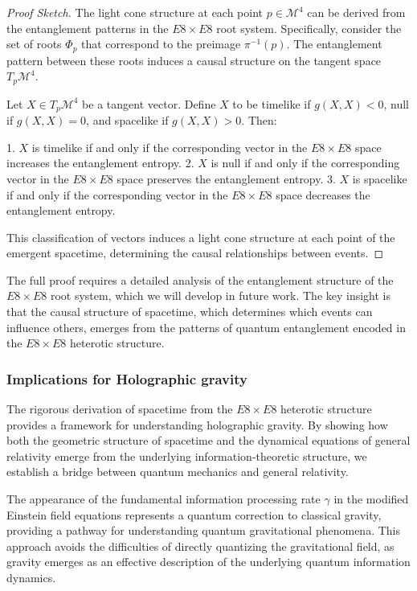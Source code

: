 \documentclass[11pt,english,twoside]{article}
\begin{document}
\begin{proof}[Proof Sketch]
The light cone structure at each point $p \in \mathcal{M}^4$ can be derived from the entanglement patterns in the $E8\times E8$ root system. Specifically, consider the set of roots $\Phi_p$ that correspond to the preimage $\pi^{-1}(p)$. The entanglement pattern between these roots induces a causal structure on the tangent space $T_p\mathcal{M}^4$.

Let $X \in T_p\mathcal{M}^4$ be a tangent vector. Define $X$ to be timelike if $g(X,X) < 0$, null if $g(X,X) = 0$, and spacelike if $g(X,X) > 0$. Then:

1. $X$ is timelike if and only if the corresponding vector in the $E8\times E8$ space increases the entanglement entropy.
2. $X$ is null if and only if the corresponding vector in the $E8\times E8$ space preserves the entanglement entropy.
3. $X$ is spacelike if and only if the corresponding vector in the $E8\times E8$ space decreases the entanglement entropy.

This classification of vectors induces a light cone structure at each point of the emergent spacetime, determining the causal relationships between events.
\end{proof}

The full proof requires a detailed analysis of the entanglement structure of the $E8\times E8$ root system, which we will develop in future work. The key insight is that the causal structure of spacetime, which determines which events can influence others, emerges from the patterns of quantum entanglement encoded in the $E8\times E8$ heterotic structure.

\subsubsection{Implications for Holographic gravity}

The rigorous derivation of spacetime from the $E8\times E8$ heterotic structure provides a framework for understanding holographic gravity. By showing how both the geometric structure of spacetime and the dynamical equations of general relativity emerge from the underlying information-theoretic structure, we establish a bridge between quantum mechanics and general relativity.

The appearance of the fundamental information processing rate $\gamma$ in the modified Einstein field equations represents a quantum correction to classical gravity, providing a pathway for understanding quantum gravitational phenomena. This approach avoids the difficulties of directly quantizing the gravitational field, as gravity emerges as an effective description of the underlying quantum information dynamics.
\end{document}
